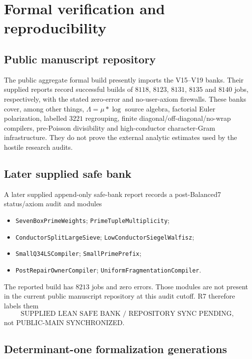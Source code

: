\documentclass[11pt]{article}
\theoremstyle{definition}
\newcommand{\1}{\mathbf 1}
\newcommand{\status}[1]{\textsf{#1}}
\begin{document}
\section{Formal verification and reproducibility}

\subsection{Public manuscript repository}

The public aggregate formal build presently imports the V15--V19 banks.  Their supplied
reports record successful builds of $8118$, $8123$, $8131$, $8135$ and $8140$ jobs,
respectively, with the stated zero-error and no-user-axiom firewalls.  These banks cover,
among other things, $\Lambda=\mu*\log$ source algebra, factorial Euler polarization,
labelled $3221$ regrouping, finite diagonal/off-diagonal/no-wrap compilers, pre-Poisson
divisibility and high-conductor character-Gram infrastructure.  They do not prove the
external analytic estimates used by the hostile research audits.

\subsection{Later supplied safe bank}

A later supplied append-only safe-bank report records a post-Balanced7 status/axiom
audit and modules
\begin{itemize}[leftmargin=2.1em,itemsep=0.05em,topsep=0.2em]
\item \texttt{SevenBoxPrimeWeights}; \texttt{PrimeTupleMultiplicity};
\item \texttt{ConductorSplitLargeSieve}; \texttt{LowConductorSiegelWalfisz};
\item \texttt{SmallQ34LSCompiler}; \texttt{SmallPrimePrefix};
\item \texttt{PostRepairOwnerCompiler}; \texttt{UniformFragmentationCompiler}.
\end{itemize}
The reported build has $8213$ jobs and zero errors.  Those
modules are not present in the current public manuscript repository at this audit cutoff.
R7 therefore labels them
\[
\boxed{\text{SUPPLIED LEAN SAFE BANK / REPOSITORY SYNC PENDING}},
\]
not \status{PUBLIC-MAIN SYNCHRONIZED}.

\subsection{Determinant-one formalization generations}
\end{document}
